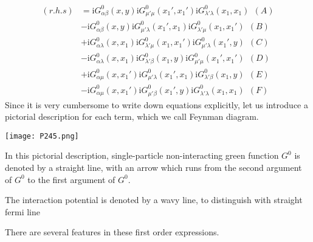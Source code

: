 \begin{align} \label{2.5.2}
(r.h.s)&=\mathrm{i}G_{\alpha\beta}^0(x,y)\mathrm{i}G^0_{\mu'\mu}(x_1',x_1')\mathrm{i}G^0_{\lambda'\lambda}(x_1,x_1) \ \ (A)\nonumber\\ 
&-\mathrm{i}G_{\alpha\beta}^0(x,y)\mathrm{i}G^0_{\mu'\lambda}(x_1',x_1)\mathrm{i}G^0_{\lambda'\mu}(x_1,x_1') \ \ (B)\nonumber \\
&+\mathrm{i}G_{\alpha\lambda}^0(x,x_1)\mathrm{i}G^0_{\lambda'\mu}(x_1,x_1')\mathrm{i}G^0_{\mu'\lambda}(x_1',y) \ \ (C)\nonumber \\
&-\mathrm{i}G_{\alpha\lambda}^0(x,x_1)\mathrm{i}G^0_{\lambda'\beta}(x_1,y)\mathrm{i}G^0_{\mu'\mu}(x_1',x_1') \ \ (D)\nonumber \\
&+\mathrm{i}G_{\alpha\mu}^0(x,x_1')\mathrm{i}G^0_{\mu'\lambda}(x_1',x_1)\mathrm{i}G^0_{\lambda'\beta}(x_1,y) \ \ (E)\nonumber \\
&-\mathrm{i}G_{\alpha\mu}^0(x,x_1')\mathrm{i}G^0_{\mu'\beta}(x_1',y)\mathrm{i}G^0_{\lambda'\lambda}(x_1,x_1) \ \ (F)
\end{align}
Since it is very cumbersome to write down equations explicitly, let us introduce a pictorial description for each term, which we call Feynman diagram.
\begin{center}
\texttt{[image: P245.png]}
\end{center}
In this pictorial description, single-particle non-interacting green function $G^0$ is denoted by a straight line, with an arrow which runs from the second argument of $G^0$ to the first argument of $G^0$.

The interaction potential is denoted by a wavy line, to distinguish with straight fermi line%

	There are several features in these first order expressions.

